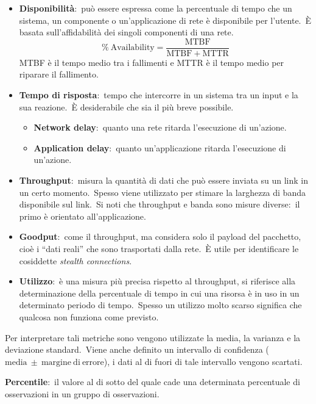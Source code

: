 \begin{itemize}
    \item \textbf{Disponibilità}:\ può essere espressa come la percentuale di tempo che un sistema, un componente o un'applicazione di rete è disponibile per l'utente.\ È basata sull'affidabilità dei singoli componenti di una rete.
          \[\%\ \mathrm{Availability} = \frac{\mathrm{MTBF}}{\mathrm{MTBF + MTTR}}\]
          MTBF è il tempo medio tra i fallimenti e MTTR è il tempo medio per riparare il fallimento.
    \item \textbf{Tempo di risposta}:\ tempo che intercorre in un sistema tra un input e la sua reazione.\ È desiderabile che sia il più breve possibile.
          \begin{itemize}
              \item \textbf{Network delay}:\ quanto una rete ritarda l'esecuzione di un'azione.
              \item \textbf{Application delay}:\ quanto un'applicazione ritarda l'esecuzione di un'azione.
          \end{itemize}
    \item \textbf{Throughput}:\ misura la quantità di dati che può essere inviata su un link in un certo momento.\ Spesso viene utilizzato per stimare la larghezza di banda disponibile sul link.\ Si noti che throughput e banda sono misure diverse:\ il primo è orientato all'applicazione.
    \item \textbf{Goodput}:\ come il throughput, ma considera solo il payload del pacchetto, cioè i ``dati reali'' che sono trasportati dalla rete.\ È utile per identificare le cosiddette \textit{stealth connections}.
    \item \textbf{Utilizzo}:\ è una misura più precisa rispetto al throughput, si riferisce alla determinazione della percentuale di tempo in cui una risorsa è in uso in un determinato periodo di tempo.\ Spesso un utilizzo molto scarso significa che qualcosa non funziona come previsto.
\end{itemize}

\noindent Per interpretare tali metriche sono vengono utilizzate la media, la varianza e la deviazione standard.\
Viene anche definito un intervallo di confidenza ($\mathrm{media\ \pm\ margine\ di\ errore}$), i dati al di fuori di tale intervallo vengono scartati.

\vspace{12pt}
\noindent\textbf{Percentile}:\ il valore al di sotto del quale cade una determinata percentuale di osservazioni in un gruppo di osservazioni.

